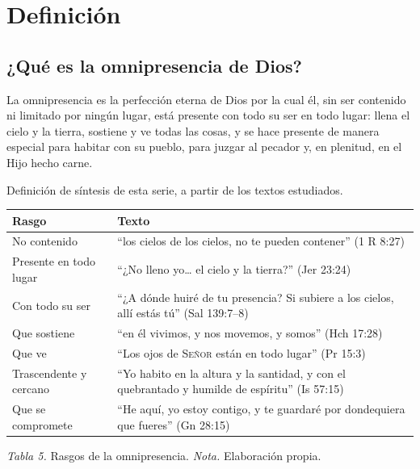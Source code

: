 \documentclass[11pt,letterpaper]{article}
\newcommand{\SENOR}{\textsc{Señor}}
\begin{document}
\section{Definición}

\subsection{¿Qué es la omnipresencia de Dios?}

\begin{tcolorbox}[colback=papiro,colframe=azul,boxrule=1pt,arc=3pt,title={Definición},colbacktitle=azul,coltitle=papiro]
La omnipresencia es la perfección eterna de Dios por la cual él, sin ser contenido ni limitado por ningún lugar, está presente con todo su ser en todo lugar: llena el cielo y la tierra, sostiene y ve todas las cosas, y se hace presente de manera especial para habitar con su pueblo, para juzgar al pecador y, en plenitud, en el Hijo hecho carne.
\end{tcolorbox}
{\footnotesize\color{gris}Definición de síntesis de esta serie, a partir de los textos estudiados.}\medskip

\begin{center}\small\renewcommand{\arraystretch}{1.2}
\begin{tabular}{@{}L{3.6cm}L{10.4cm}@{}}
\toprule
\textbf{Rasgo} & \textbf{Texto} \\ \midrule
No contenido & ``los cielos de los cielos, no te pueden contener'' (1 R 8:27) \\
Presente en todo lugar & ``¿No lleno yo\ldots{} el cielo y la tierra?'' (Jer 23:24) \\
Con todo su ser & ``¿A dónde huiré de tu presencia? Si subiere a los cielos, allí estás tú'' (Sal 139:7--8) \\
Que sostiene & ``en él vivimos, y nos movemos, y somos'' (Hch 17:28) \\
Que ve & ``Los ojos de \SENOR{} están en todo lugar'' (Pr 15:3) \\
Trascendente y cercano & ``Yo habito en la altura y la santidad, y con el quebrantado y humilde de espíritu'' (Is 57:15) \\
Que se compromete & ``He aquí, yo estoy contigo, y te guardaré por dondequiera que fueres'' (Gn 28:15) \\
\bottomrule
\end{tabular}\par
{\footnotesize\color{gris}\textit{Tabla 5.} Rasgos de la omnipresencia. \textit{Nota.} Elaboración propia.}
\end{center}
\end{document}

